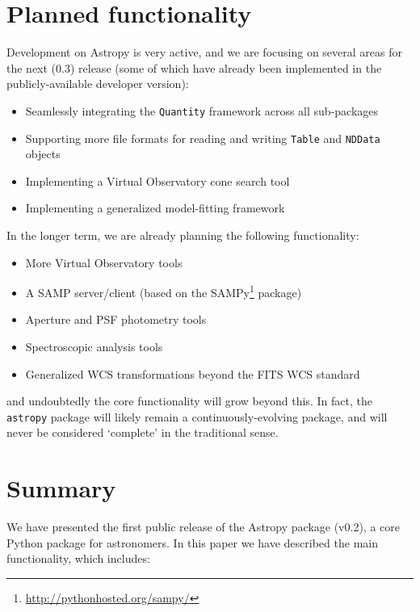 \documentclass[traditabstract]{aa}
\newcommand{\astropy}{\texttt{astropy}\xspace}
\begin{document}
\section{Planned functionality}

\label{sec:future}


Development on Astropy is very active, and we are focusing on several areas
for the next (0.3) release (some of which have already been implemented in the
publicly-available developer version):

\begin{itemize}
\item Seamlessly integrating the \texttt{Quantity} framework across all sub-packages
\item Supporting more file formats for reading and writing \texttt{Table} and \texttt{NDData} objects
\item Implementing a Virtual Observatory cone search tool
\item Implementing a generalized model-fitting framework
\end{itemize}

In the longer term, we are already planning the following functionality:

\begin{itemize}
\item More Virtual Observatory tools
\item A SAMP server/client (based on the SAMPy\footnote{\url{http://pythonhosted.org/sampy/}} package)
\item Aperture and PSF photometry tools
\item Spectroscopic analysis tools
\item Generalized WCS transformations beyond the FITS WCS standard
\end{itemize}

\noindent and undoubtedly the core functionality will grow beyond this. In fact, the \astropy package will likely remain a continuously-evolving package, and will never be considered `complete' in the traditional sense.

\section{Summary}

\label{sec:summary}


We have presented the first public release of the Astropy package (v0.2), a core
Python package for astronomers. In this paper we have described the main
functionality, which includes:
\end{document}
